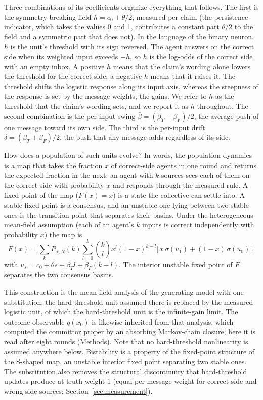 \documentclass[11pt]{article}
\begin{document}
Three combinations of its coefficients organize everything that follows.
The first is the symmetry-breaking field $h = c_0 + \theta/2$, measured
per claim (the persistence indicator, which takes the values 0 and 1,
contributes a constant part $\theta/2$ to the field and a symmetric part
that does not). In the language of the binary neuron, $h$ is the unit's
threshold with its sign reversed. The agent answers on the correct side
when its weighted input exceeds $-h$, so $h$ is the log-odds of the correct
side with an empty inbox. A positive $h$ means that the claim's wording
alone lowers the threshold for the correct side; a negative $h$ means that
it raises it. The threshold shifts the logistic response along its input
axis, whereas the steepness of the response is set by the message weights,
the gains. We refer to $h$ as the threshold that the claim's wording sets,
and we report it as $h$ throughout. The second combination is the
per-input swing $\bar\beta = (\beta_T - \beta_F)/2$, the average push of
one message toward its own side. The third is the per-input drift
$\delta = (\beta_T + \beta_F)/2$, the push that any message adds regardless
of its side.

How does a population of such units evolve? In words, the population
dynamics is a map that takes the fraction $x$ of correct-side agents in one
round and returns the expected fraction in the next: an agent with $k$
sources sees each of them on the correct side with probability $x$ and
responds through the measured rule. A fixed point of the map ($F(x) = x$)
is a state the collective can settle into. A stable fixed point is a
consensus, and an unstable one lying between two stable ones is the
transition point that separates their basins. Under the heterogeneous
mean-field assumption (each of an agent's $k$ inputs is correct
independently with probability $x$) the map is
\begin{equation}
F(x) = \sum_{k} P_{\alpha,N}(k) \sum_{l=0}^{k} \binom{k}{l}
x^{l} (1-x)^{k-l} \bigl[\, x\,\sigma(u_{1}) + (1-x)\,\sigma(u_{0})
\bigr],
\label{eq:hmfmap}
\end{equation}
with $u_{s} = c_0 + \theta s + \beta_T l + \beta_F (k-l)$. The interior
unstable fixed point of $F$ separates the two consensus basins.

This construction is the mean-field analysis of the generating model
\citep{SciRepCrowding} with one substitution: the hard-threshold unit
assumed there is replaced by the measured logistic unit, of which the
hard-threshold unit is the infinite-gain limit. The outcome observable
$q(x_0)$ is likewise inherited from that analysis, which computed the
committor proper by an absorbing Markov-chain closure; here it is read
after eight rounds (Methods). Note that no hard-threshold nonlinearity is
assumed anywhere below. Bistability is a property of the fixed-point
structure of the S-shaped map, an unstable interior fixed point separating
two stable ones. The substitution also removes the structural
discontinuity that hard-threshold updates produce at truth-weight 1 (equal
per-message weight for correct-side and wrong-side sources;
Section~\ref{sec:measurement}).
\end{document}
